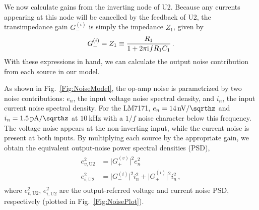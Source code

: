 \documentclass[aip,rsi,reprint]{revtex4-1} %
\newcommand{\iu}{\mathrm{i}\mkern1mu}
\begin{document}
We now calculate gains from the inverting node of U2.
Because any currents appearing at this node will be cancelled by the feedback of U2, the transimpedance gain $G_{-}^{(i)}$ is simply the impedance $Z_1$, given by
\begin{align}
G_{-}^{(i)} = Z_1 \equiv \frac{R_1}{1+2\pi \iu f R_1 C_1}\,.
\end{align}
With these expressions in hand, we can calculate the output noise contribution from each source in our model.

As shown in Fig.~\ref{Fig:NoiseModel}, the op-amp noise is parametrized by two noise contributions: $e_n$, the input voltage noise spectral density, and $i_n$, the input current noise spectral density.
For the LM7171, $e_n = \SI[per-mode=symbol]{14}{\nano\volt\per\sqrthz}$ and $i_n = \SI[per-mode=symbol]{1.5}{\pico\ampere\per\sqrthz}$ at $\SI{10}{\kilo\hertz}$ with a $1/f$ noise character below this frequency.\cite{LM7171Datasheet}
The voltage noise appears at the non-inverting input, while the current noise is present at both inputs.
By multiplying each source by the appropriate gain, we obtain the equivalent output-noise power spectral densities (PSD),
\begin{align}
\begin{split}
e^2_{v,\text{U2}} &= \big|G_{+}^{(v)}\big|^2 e^2_n \\
e^2_{i,\text{U2}} &= \big|G_{-}^{(i)}\big|^2 i^2_n + \big|G_{+}^{(i)}\big|^2 i^2_n\,,
\end{split}
\end{align}
where  $e^2_{v,\text{U2}}$, $e^2_{i,\text{U2}}$ are the output-referred voltage and current noise PSD, respectively (plotted in Fig.~\ref{Fig:NoisePlot}).
\end{document}

